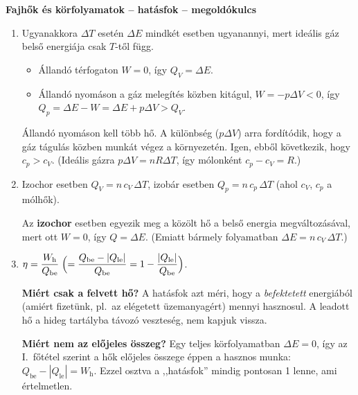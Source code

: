 \documentclass[11pt,a4paper]{article}
\begin{document}
\begin{center}
  {\large\bfseries Fajhők és körfolyamatok -- hatásfok -- megoldókulcs}\\[3pt]
\end{center}

\begin{enumerate}
\item Ugyanakkora $\Delta T$ esetén $\Delta E$ mindkét esetben ugyanannyi, mert ideális gáz
  belső energiája csak $T$-től függ.
  \begin{itemize}[nosep,leftmargin=1.5em]
    \item Állandó térfogaton $W = 0$, így $Q_V = \Delta E$.
    \item Állandó nyomáson a gáz melegítés közben kitágul, $W = -p\Delta V < 0$, így
      $Q_p = \Delta E - W = \Delta E + p\Delta V > Q_V$.
  \end{itemize}
  Állandó nyomáson kell több hő. A különbség ($p\Delta V$) arra fordítódik, hogy a gáz
  tágulás közben munkát végez a környezetén. Igen, ebből következik, hogy $c_p > c_V$.
  (Ideális gázra $p\Delta V = nR\Delta T$, így mólonként $c_p - c_V = R$.)

\item Izochor esetben $Q_V = n\,c_V\,\Delta T$, izobár esetben $Q_p = n\,c_p\,\Delta T$
  (ahol $c_V$, $c_p$ a mólhők).

  Az \textbf{izochor} esetben egyezik meg a közölt hő a belső energia megváltozásával,
  mert ott $W = 0$, így $Q = \Delta E$. (Emiatt bármely folyamatban
  $\Delta E = n\,c_V\,\Delta T$.)

\item $\displaystyle \eta = \frac{W_\text{h}}{Q_\text{be}}
  \;\Bigl(= \frac{Q_\text{be} - |Q_\text{le}|}{Q_\text{be}}
  = 1 - \frac{|Q_\text{le}|}{Q_\text{be}}\Bigr)$.

  \textbf{Miért csak a felvett hő?} A hatásfok azt méri, hogy a \emph{befektetett}
  energiából (amiért fizetünk, pl.\ az elégetett üzemanyagért) mennyi hasznosul. A leadott
  hő a hideg tartályba távozó veszteség, nem kapjuk vissza.

  \textbf{Miért nem az előjeles összeg?} Egy teljes körfolyamatban $\Delta E = 0$, így az
  I.~főtétel szerint a hők előjeles összege éppen a hasznos munka: $Q_\text{be} -
  |Q_\text{le}| = W_\text{h}$. Ezzel osztva a ,,hatásfok'' mindig pontosan 1 lenne,
  ami értelmetlen.


\end{enumerate}
\end{document}
